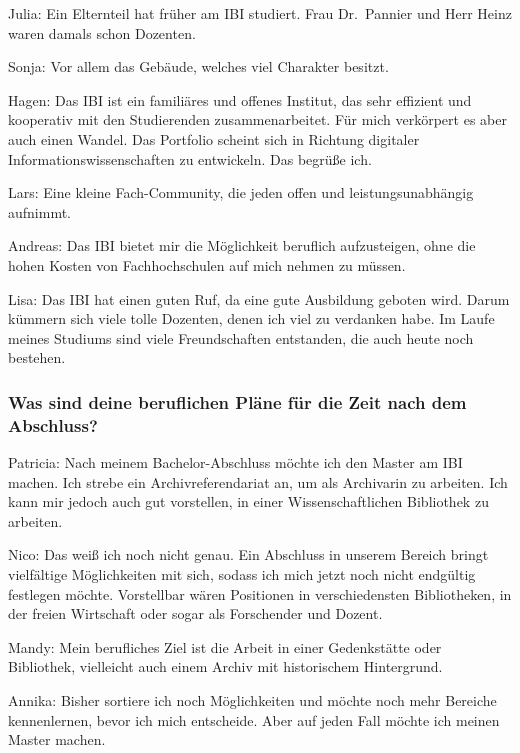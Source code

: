\documentclass[a4paper,
fontsize=11pt,
oneside,
numbers=noperiodatend,
parskip=half-,
bibliography=totoc,
final
]{scrartcl}
\begin{document}
Julia: Ein Elternteil hat früher am IBI studiert. Frau Dr.~Pannier und
Herr Heinz waren damals schon Dozenten.

Sonja: Vor allem das Gebäude, welches viel Charakter besitzt.

Hagen: Das IBI ist ein familiäres und offenes Institut, das sehr
effizient und kooperativ mit den Studierenden zusammenarbeitet. Für mich
verkörpert es aber auch einen Wandel. Das Portfolio scheint sich in
Richtung digitaler Informationswissenschaften zu entwickeln. Das begrüße
ich.

Lars: Eine kleine Fach-Community, die jeden offen und
leistungsunabhängig aufnimmt.

Andreas: Das IBI bietet mir die Möglichkeit beruflich aufzusteigen, ohne
die hohen Kosten von Fachhochschulen auf mich nehmen zu müssen.

Lisa: Das IBI hat einen guten Ruf, da eine gute Ausbildung geboten wird.
Darum kümmern sich viele tolle Dozenten, denen ich viel zu verdanken
habe. Im Laufe meines Studiums sind viele Freundschaften entstanden, die
auch heute noch bestehen.

\hypertarget{was-sind-deine-beruflichen-pluxe4ne-fuxfcr-die-zeit-nach-dem-abschluss}{%
\subsubsection{Was sind deine beruflichen Pläne für die Zeit nach dem
Abschluss?}\label{was-sind-deine-beruflichen-pluxe4ne-fuxfcr-die-zeit-nach-dem-abschluss}}

Patricia: Nach meinem Bachelor-Abschluss möchte ich den Master am IBI
machen. Ich strebe ein Archivreferendariat an, um als Archivarin zu
arbeiten. Ich kann mir jedoch auch gut vorstellen, in einer
Wissenschaftlichen Bibliothek zu arbeiten.

Nico: Das weiß ich noch nicht genau. Ein Abschluss in unserem Bereich
bringt vielfältige Möglichkeiten mit sich, sodass ich mich jetzt noch
nicht endgültig festlegen möchte. Vorstellbar wären Positionen in
verschiedensten Bibliotheken, in der freien Wirtschaft oder sogar als
Forschender und Dozent.

Mandy: Mein berufliches Ziel ist die Arbeit in einer Gedenkstätte oder
Bibliothek, vielleicht auch einem Archiv mit historischem Hintergrund.

Annika: Bisher sortiere ich noch Möglichkeiten und möchte noch mehr
Bereiche kennenlernen, bevor ich mich entscheide. Aber auf jeden Fall
möchte ich meinen Master machen.
\end{document}
